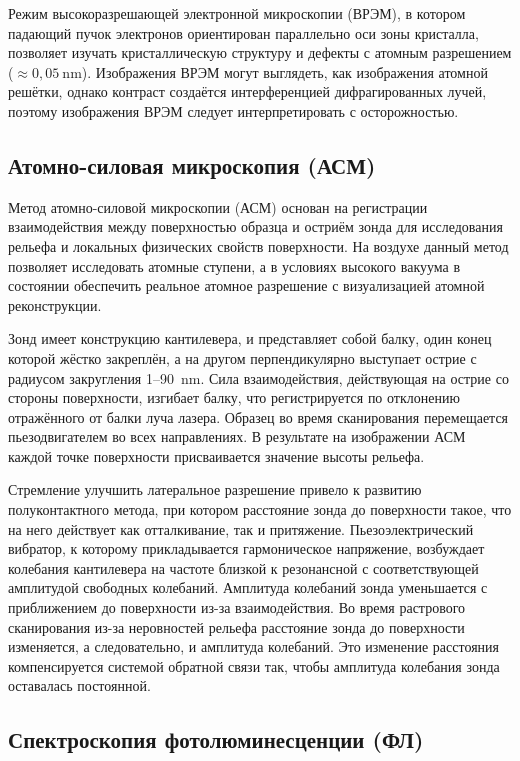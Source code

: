Режим высокоразрешающей электронной микроскопии (ВРЭМ), в котором падающий
пучок электронов ориентирован параллельно оси зоны кристалла, позволяет изучать
кристаллическую структуру и дефекты с атомным разрешением
(\(\approx0,05~\si{\nano\meter}\)). Изображения ВРЭМ могут выглядеть, как
изображения атомной решётки, однако контраст создаётся интерференцией
дифрагированных лучей, поэтому изображения ВРЭМ следует интерпретировать с
осторожностью.

\subsection{Атомно-силовая микроскопия (АСМ)}\label{subsec:ch2/sec2/sub2}

Метод атомно-силовой микроскопии (АСМ) основан на регистрации взаимодействия
между поверхностью образца и остриём зонда для исследования рельефа и локальных
физических свойств поверхности. На воздухе данный метод позволяет исследовать
атомные ступени, а в условиях высокого вакуума в состоянии обеспечить реальное
атомное разрешение с визуализацией атомной реконструкции.

Зонд имеет конструкцию кантилевера, и представляет собой балку, один конец
которой жёстко закреплён, а на другом перпендикулярно выступает острие с
радиусом закругления 1--90~\si{\nano\meter}. Сила взаимодействия, действующая
на острие со стороны поверхности, изгибает балку, что регистрируется по
отклонению отражённого от балки луча лазера. Образец во время сканирования
перемещается пьезодвигателем во всех направлениях. В результате на изображении
АСМ каждой точке поверхности присваивается значение высоты рельефа.

Стремление улучшить латеральное разрешение привело к развитию полуконтактного
метода, при котором расстояние зонда до поверхности такое, что на него
действует как отталкивание, так и притяжение. Пьезоэлектрический вибратор, к
которому прикладывается гармоническое напряжение, возбуждает колебания
кантилевера на частоте близкой к резонансной с соответствующей амплитудой
свободных колебаний. Амплитуда колебаний зонда уменьшается с приближением до
поверхности из-за взаимодействия. Во время растрового сканирования из-за
неровностей рельефа расстояние зонда до поверхности изменяется, а
следовательно, и амплитуда колебаний. Это изменение расстояния компенсируется
системой обратной связи так, чтобы амплитуда колебания зонда оставалась
постоянной.

\subsection{Спектроскопия фотолюминесценции (ФЛ)}\label{subsec:ch2/sec2/sub3}

